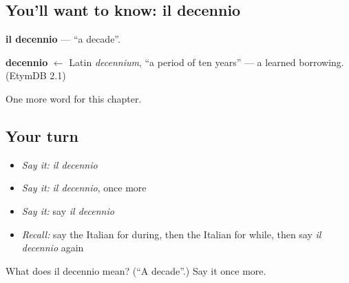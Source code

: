 \subsection*{You'll want to know: il decennio}
\textbf{il decennio} — \textquotedblleft{}a decade\textquotedblright{}.

\begin{cousinweb}
\textbf{decennio} $\leftarrow$ Latin \emph{decennium}, \textquotedblleft{}a period of ten years\textquotedblright{} — a learned borrowing. (EtymDB 2.1)
\end{cousinweb}

\begin{grammarlens}[title={What you've built}]
One more word for this chapter.
\end{grammarlens}

\subsection*{Your turn}
\begin{itemize}
\raggedright
  \item \emph{Say it:} \emph{il decennio}
  \item \emph{Say it:} \emph{il decennio}, once more
  \item \emph{Say it:} say \emph{il decennio}
  \item \emph{Recall:} say the Italian for during, then the Italian for while, then say \emph{il decennio} again
\end{itemize}

\begin{tcolorbox}[breakable,colback=teal!4,colframe=teal!35!black,title={Before you move on}]
What does il decennio mean? (\textquotedblleft{}A decade\textquotedblright{}.) Say it once more.
\end{tcolorbox}
